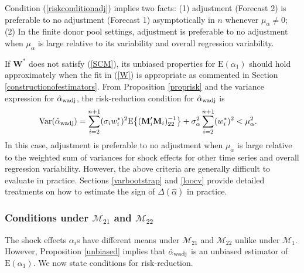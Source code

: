 \documentclass[11pt,3p,review,authoryear]{elsarticle}
\def\mbf#1{\mathbf{#1}} %
\def\mrm#1{\mathrm{#1}} %
\def\mc#1{\mathcal{#1}} %
\def\E#1{\mathrm{E}(#1)} %
\def\var#1{\mathrm{Var}(#1)} %
\theoremstyle{definition}
\begin{document}
Condition (\ref{riskconditionadj}) implies two facts: (1) adjustment (Forecast 2) is preferable to no adjustment (Forecast 1) asymptotically in $n$ whenever $\mu_{\alpha} \neq 0$; (2) In the finite donor pool settings, adjustment is preferable to no adjustment when $\mu_{\alpha}$ is large relative to its variability and overall regression variability.   

If  $\mathbf{W}^*$ does not satisfy (\ref{SCM}), its unbiased properties for $\E{\alpha_1}$ should hold approximately when the fit in (\ref{W}) is appropriate as commented in Section \ref{constructionofestimators}. From Proposition \ref{proprisk} and the variance expression for $\hat{\alpha}_{\rm wadj}$, the risk-reduction condition for $\hat{\alpha}_{\rm wadj}$ is
\begin{align} \label{varwadj}
\var{\hat{\alpha}_{\rm wadj}}
 &= \sum_{i=2}^{n+1}(\sigma_i w_i^*)^2\mrm{E}\big\{(\mbf{M}'_i\mbf{M}_i)^{-1}_{22}\big\}+\sigma^2_{\alpha}\sum_{i=2}^{n+1}(w_i^*)^2 < \mu_{\alpha}^2.
\end{align}
In this case, adjustment is preferable to no adjustment when $\mu_{\alpha}$ is large relative to the weighted sum of variances for shock effects for other time series and overall regression variability.  However, the above criteria are generally difficult to evaluate in practice.  Sections \ref{varbootstrap} and \ref{loocv}  provide detailed treatments on how to estimate the sign of $\Delta(\hat\alpha)$ in practice.





\subsubsection{Conditions under $\mc{M}_{21}$ and $\mc{M}_{22}$}
\label{conditionsm2122}

The shock effects $\alpha_i$s have different means under $\mc{M}_{21}$ and $\mc{M}_{22}$ unlike under $\mc{M}_1$. However, Proposition \ref{unbiased} implies that $\hat{\alpha}_{\rm wadj}$ is an unbiased estimator of $\E{\alpha_1}$. We now state conditions for risk-reduction.
\end{document}
